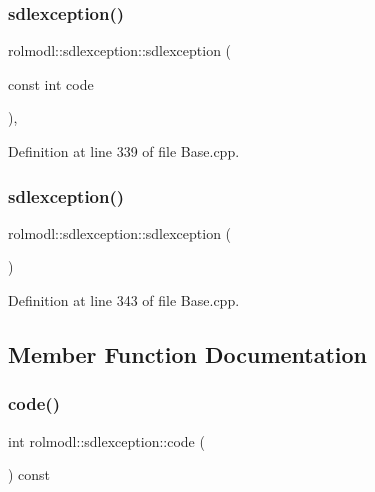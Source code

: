 \subsubsection{\texorpdfstring{sdlexception()}{sdlexception()}\hspace{0.1cm}{\footnotesize\ttfamily [1/2]}}
{\footnotesize\ttfamily rolmodl\+::sdlexception\+::sdlexception (\begin{DoxyParamCaption}\item[{const int}]{code }\end{DoxyParamCaption})\hspace{0.3cm}{\ttfamily [explicit]}, {\ttfamily [noexcept]}}



Definition at line 339 of file Base.\+cpp.

\mbox{\label{structrolmodl_1_1sdlexception_a8c25ca2298c2d8becc22c6f67f1b63e9}} 
\subsubsection{\texorpdfstring{sdlexception()}{sdlexception()}\hspace{0.1cm}{\footnotesize\ttfamily [2/2]}}
{\footnotesize\ttfamily rolmodl\+::sdlexception\+::sdlexception (\begin{DoxyParamCaption}{ }\end{DoxyParamCaption})\hspace{0.3cm}{\ttfamily [noexcept]}}



Definition at line 343 of file Base.\+cpp.



\subsection{Member Function Documentation}
\mbox{\label{structrolmodl_1_1sdlexception_a930d081c76f0d191ea13b86755416db1}} 
\subsubsection{\texorpdfstring{code()}{code()}}
{\footnotesize\ttfamily int rolmodl\+::sdlexception\+::code (\begin{DoxyParamCaption}{ }\end{DoxyParamCaption}) const\hspace{0.3cm}{\ttfamily [noexcept]}}



